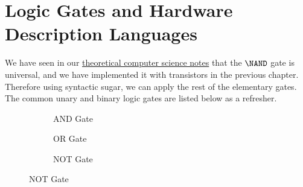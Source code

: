 \section{Logic Gates and Hardware Description Languages}

  We have seen in our \hyperref[th-thm:nand_univ]{theoretical computer science notes} that the $\NAND$ gate is universal, and we have implemented it with transistors in the previous chapter. Therefore using syntactic sugar, we can apply the rest of the elementary gates. The common unary and binary logic gates are listed below as a refresher. 

  \begin{figure}[H]
    \centering 
    \begin{subfigure}[b]{0.32\textwidth}
      \centering
      \caption{AND Gate}
      \label{fig:and}
    \end{subfigure}
    \hfill 
    \begin{subfigure}[b]{0.32\textwidth}
      \centering
      \caption{OR Gate}
      \label{fig:or}
    \end{subfigure}
    \hfill 
    \begin{subfigure}[b]{0.32\textwidth}
      \centering
      \caption{NOT Gate}
      \label{fig:not}
    \end{subfigure}
    

\end{figure}
